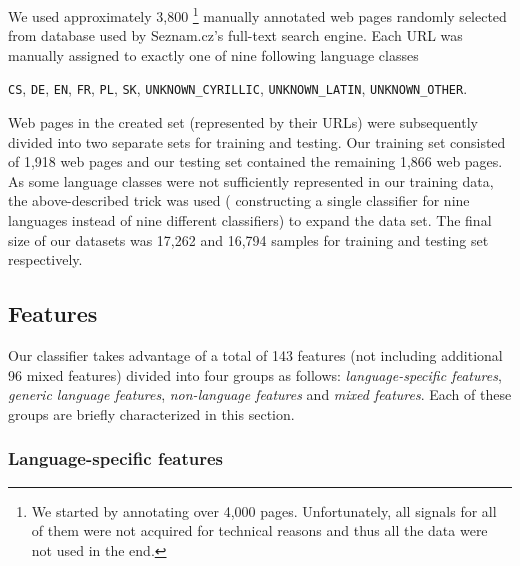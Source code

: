 \documentclass{acm_proc_article-sp}
\begin{document}
  We used approximately 3,800 \footnote{We started by annotating over 4,000 pages.
  Unfortunately, all signals for all of them were not acquired for technical reasons and thus
  all the data were not used in the end.} manually annotated 
  web pages randomly selected from database
  used by Seznam.cz's full-text search engine. Each URL was manually assigned
  to exactly one of nine following language classes {\texttt{CS}, \texttt{DE},
  \texttt{EN}, \texttt{FR}, \texttt{PL}, \texttt{SK},  
  \texttt{UNKNOWN\_CYRILLIC}, \texttt{UNKNOWN\_LATIN},
  \texttt{UNKNOWN\_OTHER}. 
  
  Web pages in the created set (represented by their
  URLs) were subsequently divided into two separate sets for training and
  testing. Our training set consisted of 1,918 web pages and our testing set
  contained the remaining 1,866 web pages. 
  As some language classes were not sufficiently represented in our training
  data, the above-described trick was used ( constructing a single classifier for
  nine languages instead of nine different classifiers) to expand the data set.
  The final size of our datasets was 17,262 and 16,794 samples for training and testing set respectively.


  \subsection{Features}
  Our classifier takes advantage of a total of 143 features (not including additional 96 mixed features) divided into four groups
  as follows: \textit{language-specific features}, \textit{generic language features}, \textit{non-language
  features} and \textit{mixed features}. Each of these
  groups are briefly characterized in this section.

\subsubsection{Language-specific features}

}
\end{document}

